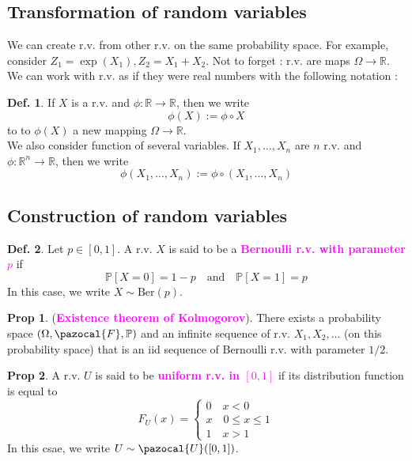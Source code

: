 \documentclass[8pt,a4paper,landscape]{article}
\theoremstyle{definition}
\newtheorem{definition}{Def.}[section]
\theoremstyle{example}
\theoremstyle{intuition}
\theoremstyle{definition}
\newtheorem{proposition}{Prop}[section]
\newcommand{\Fb}{\pazocal{F}}
\newcommand{\Ub}{\pazocal{U}}
\newcommand{\mydef}[1]{\textcolor{magenta}{\textbf{#1}}}
\newcommand{\prob}[1]{\mathbb{P}\left[ #1 \right]}
\begin{document}
\begin{multicols}{3}
				
			\subsection{Transformation of random variables}
				
				We can create r.v. from other r.v. on the same probability space. For example, consider $Z_1 = \exp(X_1), Z_2 = X_1 + X_2$. Not to forget : r.v. are maps $\Omega \to \mathbb{R}$.\\
				We can work with r.v. as if they were real numbers with the following notation :
				\begin{definition}
					If $X$ is a r.v. and $\phi : \mathbb{R} \to \mathbb{R}$, then we write 
					$$
						\phi(X) := \phi \circ X 
					$$
					to to $\phi(X)$ a new mapping $\Omega \to \mathbb{R}$.\\
					We also consider function of several variables. If $X_1, \ldots, X_n$ are $n$ r.v. and $\phi : \mathbb{R}^n \to \mathbb{R}$, then we write 
					$$
						\phi(X_1, \ldots, X_n) := \phi \circ (X_1, \ldots, X_n)
					$$
				\end{definition} 

			
			\subsection{Construction of random variables}
				
			\begin{definition} \label{Bernoulli_rv}
					Let $p \in \left[0,1\right]$. A r.v. $X$ is said to be a \mydef{Bernoulli r.v. with parameter $p$} if 
					$$
					\prob{X = 0} = 1-p \quad \text{and} \quad \prob{X = 1} = p
					$$
				In this case, we write $X \sim \text{Ber}(p)$.
				\end{definition}

				\begin{proposition}
					(\mydef{Existence theorem of Kolmogorov}). There exists a probability space $(\Omega, \Fb, \mathbb{P})$ and an infinite sequence of r.v. $X_1, X_2, \ldots$ (on this probability space) that is an iid sequence of Bernoulli r.v. with parameter $1/2$.
				\end{proposition}

				\begin{proposition}
					A r.v. $U$ is said to be \mydef{uniform r.v. in $\left[0,1\right]$} if its distribution function is equal to 
					$$
					F_U(x) = \begin{cases}
						0 \quad x < 0 \\
						x \quad 0 \leq x \leq 1 \\
						1 \quad x > 1
					\end{cases}
					$$
					In this csae, we write $U \sim \Ub (\left[0,1\right])$.
				\end{proposition}


\end{multicols}
\end{document}

